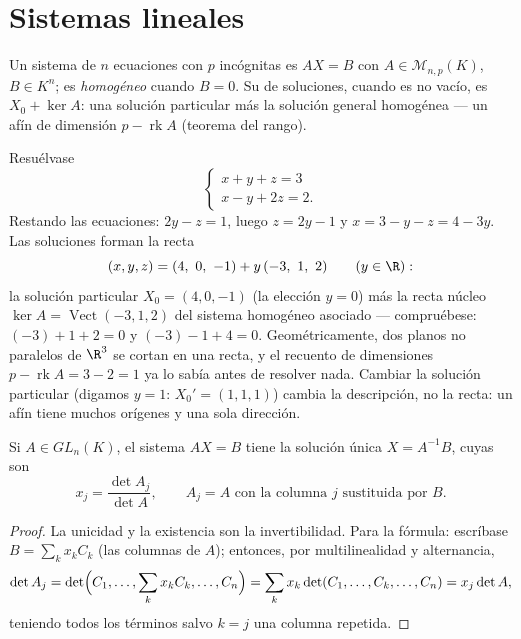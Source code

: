 \section{Sistemas lineales}

\begin{definition}\label{def:b1:det:system}
Un sistema  de $n$ ecuaciones con $p$
incógnitas es $AX = B$ con $A \in \mathcal{M}_{n,p}(K)$,
$B \in K^n$; es \emph{homogéneo} cuando $B = 0$. Su  de
soluciones, cuando es no vacío, es $X_0 + \ker A$: una solución
particular más la solución general homogénea --- un  afín
de dimensión $p - \operatorname{rk} A$ (teorema del rango).
\end{definition}

\begin{example}
\label{ex:b1:det:affinestructure}
Resuélvase
\[
\begin{cases}
x + y + z = 3\\
x - y + 2z = 2 .
\end{cases}
\]
Restando las ecuaciones: $2y - z = 1$, luego $z = 2y - 1$ y
$x = 3 - y - z = 4 - 3y$. Las soluciones forman la recta
\[
(x, y, z) = (4,\ 0,\ -1) + y\,(-3,\ 1,\ 2)
\qquad (y \in \R):
\]
la solución particular $X_0 = (4, 0, -1)$ (la elección $y = 0$) más
la recta núcleo $\ker A = \operatorname{Vect}(-3, 1, 2)$ del sistema
homogéneo asociado --- compruébese: $(-3) + 1 + 2 = 0$ y
$(-3) - 1 + 4 = 0$. Geométricamente, dos planos no paralelos de
$\R^3$ se cortan en una recta, y el recuento de dimensiones
$p - \operatorname{rk} A = 3 - 2 = 1$ ya lo sabía antes de resolver
nada. Cambiar la solución particular (digamos $y = 1$:
$X_0' = (1, 1, 1)$) cambia la descripción, no la recta: un
 afín tiene muchos orígenes y una sola dirección.
\end{example}

\begin{theorem}\label{thm:b1:det:cramer}
Si $A \in GL_n(K)$, el sistema $AX = B$ tiene la solución única
$X = A^{-1}B$, cuyas  son
\[
x_j = \frac{\det A_j}{\det A},
\qquad A_j = A \text{ con la columna } j \text{ sustituida por } B .
\]
\end{theorem}

\begin{proof}
La unicidad y la existencia son la invertibilidad. Para la fórmula:
escríbase $B = \sum_k x_k C_k$ (las columnas de $A$); entonces, por
multilinealidad y alternancia,
\[
\det A_j = \det\Bigl(C_1, \dots, \sum_k x_k C_k, \dots, C_n\Bigr)
= \sum_k x_k \det(C_1, \dots, C_k, \dots, C_n)
= x_j \det A ,
\]
teniendo todos los términos salvo $k = j$ una columna repetida.
\end{proof}

